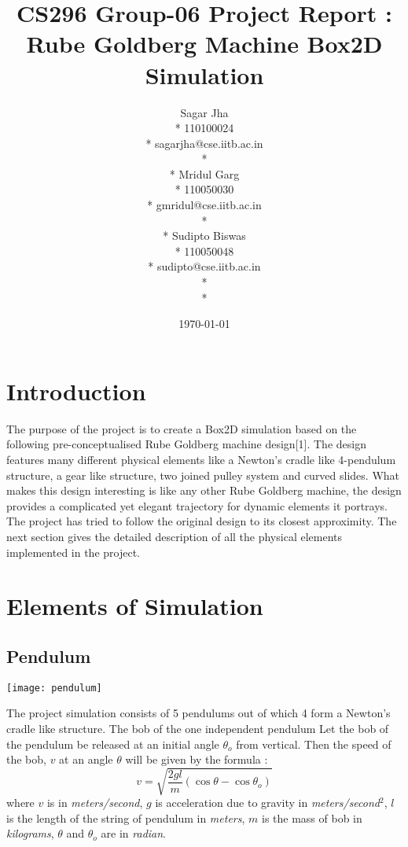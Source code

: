 \documentclass[11pt]{article}
\begin{document}
\title{CS296 Group-06 Project Report : Rube Goldberg Machine Box2D Simulation}
\author{ 
Sagar Jha\\*
110100024\\*
sagarjha@cse.iitb.ac.in\\*\\*
Mridul Garg\\*
110050030\\*
gmridul@cse.iitb.ac.in\\*\\*
Sudipto Biswas \\*
110050048\\*
sudipto@cse.iitb.ac.in\\*\\*
}
\date{\today}
\maketitle

\section{Introduction}
The purpose of the project is to create a Box2D simulation based on the following pre-conceptualised Rube Goldberg machine design[1]. The design features many different physical elements like a Newton's cradle like 4-pendulum structure, a gear like structure, two joined pulley system and curved slides. What makes this design interesting is like any other Rube Goldberg machine, the design provides a complicated yet elegant trajectory for dynamic elements it portrays. The project has tried to follow the original design to its closest approximity. The next section gives the detailed description of all the physical elements implemented in the project. 
\section{Elements of Simulation}
\subsection{Pendulum}
\begin{center}
\texttt{[image: pendulum]}
\end{center}
The project simulation consists of 5 pendulums out of which 4 form a Newton's cradle like structure. The bob of the one independent pendulum 
Let the bob of the pendulum\cite{pendulum} be released at an initial angle $\theta_o$  from vertical. Then the speed of the bob, $v$ at an angle $\theta$  will be given by the formula :
\begin{equation}
                                                  v = \sqrt{\frac{2gl}{m}(\cos\theta - \cos\theta_o)}
\end{equation}
where $v$ is in \emph{meters/second}, $g$ is acceleration due to gravity in \emph{meters/second$^2$}, $l$ is the length of the string of pendulum in \emph{meters}, $m$ is the mass of bob in \emph{kilograms}, $\theta$ and $\theta_o$ are in \emph{radian}.
\end{document}
